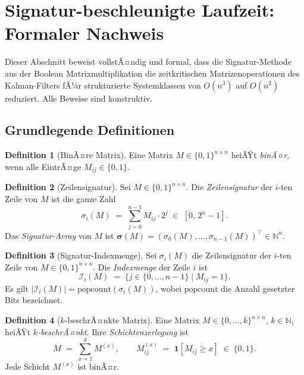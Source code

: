﻿\documentclass[a4paper,12pt]{article}
\theoremstyle{definition}
\newtheorem{definition}{Definition}
\begin{document}
\section{Signatur-beschleunigte Laufzeit: Formaler Nachweis}
\label{sec:laufzeit}

Dieser Abschnitt beweist vollstÃ¤ndig und formal, dass die Signatur-Methode
aus der Boolean Matrixmultiplikation \cite{epp2026boolmm} die zeitkritischen
Matrizenoperationen des Kalman-Filters fÃ¼r strukturierte Systemklassen von
$O(n^3)$ auf $O(n^2)$ reduziert. Alle Beweise sind konstruktiv.

\subsection{Grundlegende Definitionen}

\begin{definition}[BinÃ¤re Matrix]
    Eine Matrix $M \in \{0,1\}^{n \times n}$ heiÃŸt \emph{binÃ¤r}, wenn alle
    EintrÃ¤ge $M_{ij} \in \{0,1\}$.
\end{definition}

\begin{definition}[Zeilensignatur]
\label{def:rowsig}
    Sei $M \in \{0,1\}^{n \times n}$. Die \emph{Zeilensignatur} der $i$-ten Zeile
    von $M$ ist die ganze Zahl
    \[
        \sigma_i(M) \;=\; \sum_{j=0}^{n-1} M_{ij} \cdot 2^j \;\in\; [0,\, 2^n-1].
    \]
    Das \emph{Signatur-Array} von $M$ ist $\boldsymbol{\sigma}(M)
    = (\sigma_0(M), \ldots, \sigma_{n-1}(M))^\top \in \mathbb{N}^n$.
\end{definition}

\begin{definition}[Signatur-Indexmenge]
\label{def:idxset}
    Sei $\sigma_i(M)$ die Zeilensignatur der $i$-ten Zeile von $M \in \{0,1\}^{n\times n}$.
    Die \emph{Indexmenge} der Zeile $i$ ist
    \[
        \mathcal{I}_i(M) \;=\; \bigl\{j \in \{0,\ldots,n-1\} \mid M_{ij} = 1\bigr\}.
    \]
    Es gilt $|\mathcal{I}_i(M)| = \mathrm{popcount}(\sigma_i(M))$, wobei
    $\mathrm{popcount}$ die Anzahl gesetzter Bits bezeichnet.
\end{definition}

\begin{definition}[$k$-beschrÃ¤nkte Matrix]
    Eine Matrix $M \in \{0,\ldots,k\}^{n \times n}$, $k \in \mathbb{N}$, heiÃŸt
    \emph{$k$-beschrÃ¤nkt}. Ihre \emph{Schichtenzerlegung} ist
    \[
        M \;=\; \sum_{x=1}^{k} M^{(x)}, \qquad
        M^{(x)}_{ij} \;=\; \mathbf{1}[M_{ij} \geq x] \;\in\; \{0,1\}.
    \]
    Jede Schicht $M^{(x)}$ ist binÃ¤r.
\end{definition}
\end{document}
